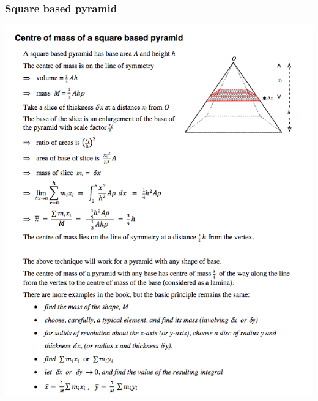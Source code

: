 \documentclass[a4paper]{article}
\begin{document}
\subsubsection{Square based pyramid}
\begin{center}
    \includegraphics[scale=0.5]{img_M/14_intro4}
\end{center}
\end{document}
